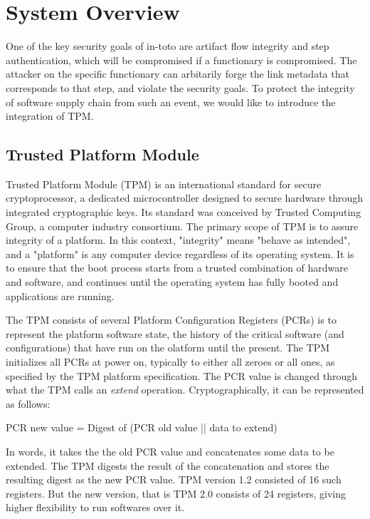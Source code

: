 \section{System Overview}
One of the key security goals of in-toto are artifact flow integrity and step authentication, which will be compromised if a functionary is compromised. The attacker on the specific functionary can arbitarily forge the link metadata that corresponds to that step, and violate the security goals. To protect the integrity of software supply chain from such an event, we would like to introduce the integration of TPM.

\subsection{Trusted Platform Module}
Trusted Platform Module (TPM) is an international standard for secure cryptoprocessor, a dedicated microcontroller designed to secure hardware through integrated cryptographic keys. Its standard was conceived by Trusted Computing Group, a computer industry consortium. The primary scope of TPM is to assure integrity of a platform. In this context, "integrity" means "behave as intended", and a "platform" is any computer device regardless of its operating system. It is to ensure that the boot process starts from a trusted combination of hardware and software, and continues until the operating system has fully booted and applications are running.

The TPM consists of several Platform Configuration Registers (PCRs) is to represent the platform software state, the history of the critical software (and configurations) that have
run on the olatform until the present. The TPM initializes all PCRs at power on, typically to either all zeroes or all ones, as specified by the TPM platform specification. The PCR
value is changed through what the TPM calls an \textit{extend} operation. Cryptographically, it can be represented as follows:

PCR new value = Digest of (PCR old value || data to extend)

In words, it takes the the old PCR value and concatenates some data to be extended. The TPM digests the result of the concatenation and stores the resulting digest as the new PCR value. TPM version 1.2 consisted of 16 such registers. But the new version, that is TPM 2.0 consists of 24 registers, giving higher flexibility to run softwares over it.
